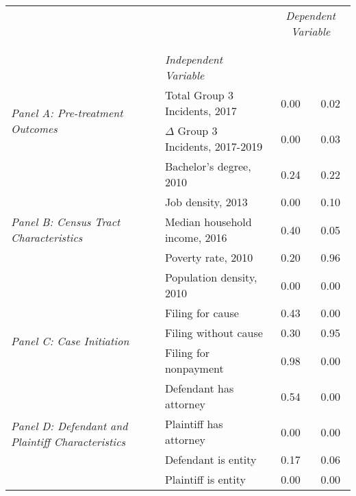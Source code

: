 \begin{tabular}{llcc}
\toprule
 &  & \multicolumn{2}{c}{\textit{Dependent Variable}} \\
\cline{3-4}
\\
 &  &  &  \\
 & \emph{Independent Variable} &  &  \\
\midrule
\multirow[c]{2}{3cm}{\textit{Panel A: Pre-treatment Outcomes}} & Total Group 3 Incidents, 2017 & 0.00 & 0.02 \\
 & $\Delta$ Group 3 Incidents, 2017-2019 & 0.00 & 0.03 \\
\cline{1-4}
\multirow[c]{5}{3cm}{\textit{Panel B: Census Tract Characteristics}} & Bachelor's degree, 2010 & 0.24 & 0.22 \\
 & Job density, 2013 & 0.00 & 0.10 \\
 & Median household income, 2016 & 0.40 & 0.05 \\
 & Poverty rate, 2010 & 0.20 & 0.96 \\
 & Population density, 2010 & 0.00 & 0.00 \\
\cline{1-4}
\multirow[c]{3}{3cm}{\textit{Panel C: Case Initiation}} & Filing for cause & 0.43 & 0.00 \\
 & Filing without cause & 0.30 & 0.95 \\
 & Filing for nonpayment & 0.98 & 0.00 \\
\cline{1-4}
\multirow[c]{4}{3cm}{\textit{Panel D: Defendant and Plaintiff Characteristics}} & Defendant has attorney & 0.54 & 0.00 \\
 & Plaintiff has attorney & 0.00 & 0.00 \\
 & Defendant is entity & 0.17 & 0.06 \\
 & Plaintiff is entity & 0.00 & 0.00 \\
\cline{1-4}
\bottomrule
\end{tabular}
